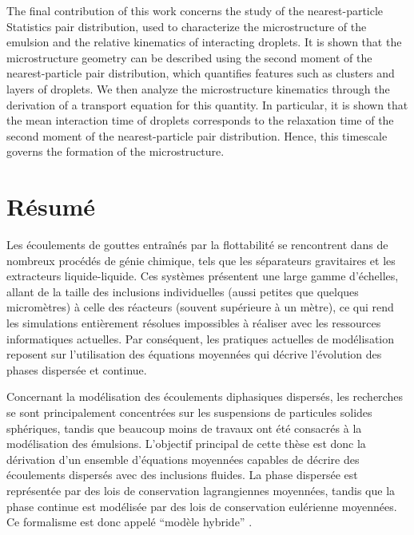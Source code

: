 The final contribution of this work concerns the study of the nearest-particle Statistics pair distribution, used to characterize the microstructure of the emulsion and the relative kinematics   of interacting droplets.
It is shown that the microstructure geometry can be described using the second moment of the nearest-particle pair distribution, which quantifies features such as clusters and layers of droplets.
We then analyze the microstructure kinematics through the derivation of a transport equation for this quantity.
In particular, it is shown that the mean interaction time of droplets corresponds to the relaxation time of the second moment of the nearest-particle pair distribution. 
Hence, this timescale governs the formation of the microstructure.




\newpage
\chapter*{\centering R\'esum\'e}


Les \'ecoulements de gouttes entra\^in\'es par la flottabilit\'e se rencontrent dans de nombreux proc\'ed\'es de g\'enie chimique, tels que les s\'eparateurs gravitaires et les extracteurs liquide-liquide.
Ces syst\`emes pr\'esentent une large gamme d'\'echelles, allant de la taille des inclusions individuelles (aussi petites que quelques microm\`etres) \`a celle des r\'eacteurs (souvent sup\'erieure \`a un m\`etre), ce qui rend les simulations enti\`erement r\'esolues impossibles \`a r\'ealiser avec les ressources informatiques actuelles.
Par cons\'equent, les pratiques actuelles de mod\'elisation reposent sur l'utilisation des \'equations moyenn\'ees qui d\'ecrive l'\'evolution des phases dispers\'ee et continue.


Concernant la mod\'elisation des \'ecoulements diphasiques dispers\'es, les recherches se sont principalement concentr\'ees sur les suspensions de particules solides sph\'eriques, tandis que beaucoup moins de travaux ont \'et\'e consacr\'es \`a la mod\'elisation des \'emulsions.
L'objectif principal de cette th\`ese est donc la d\'erivation d'un ensemble d'\'equations moyen\-n\'ees capables de d\'ecrire des \'ecoulements dispers\'es avec des inclusions fluides. 
La phase dispers\'ee est repr\'esent\'ee par des lois de conservation lagrangiennes  moyenn\'ees, tandis que la phase continue est mod\'elis\'ee par des lois de conservation eul\'erienne moyenn\'ees.
Ce formalisme est donc appel\'e  ``mod\`ele hybride'' .

